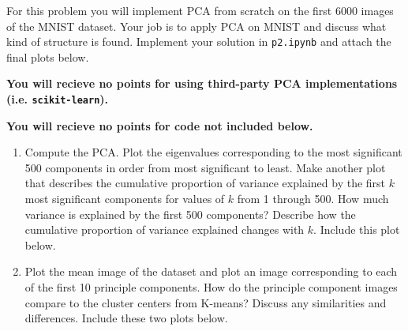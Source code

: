 \documentclass[submit]{harvardml}
\begin{document}
\begin{problem}

% 
% 

  
For this problem you will implement PCA from scratch on the first 6000 images of the MNIST dataset. Your job is to apply PCA on MNIST and discuss what kind of structure is found. Implement your solution in \texttt{p2.ipynb} and attach the final plots below.

{\bfseries You will recieve no points for using third-party PCA implementations (i.e. {\normalfont \texttt{scikit-learn}}).}

{\bfseries You will recieve no points for code not included below.}
\begin{enumerate}

\item Compute the PCA. Plot the eigenvalues corresponding to the most
  significant 500 components in order from most significant to
  least. Make another plot that describes the cumulative proportion of
  variance explained by the first $k$ most significant components for
  values of $k$ from 1 through 500.  How much variance is explained by
  the first 500 components?  Describe how the cumulative proportion of
  variance explained changes with $k$.  Include this plot below.

\item Plot the mean image of the dataset and plot an image
  corresponding to each of the first 10 principle components.  How do
  the principle component images compare to the cluster centers from
  K-means? Discuss any similarities and differences.  Include these
  two plots below.


\end{enumerate}
\end{problem}
\end{document}
